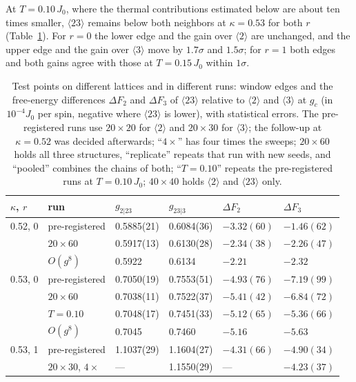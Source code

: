 \documentclass[aps,prb,twocolumn,superscriptaddress,floatfix]{revtex4-2}
\begin{document}
At $T=0.10\,J_0$, where the thermal contributions estimated below are about ten times smaller, $\langle23\rangle$
remains below both neighbors at $\kappa=0.53$ for both $r$ (Table~\ref{tab:lattices}). For $r=0$ the lower edge and the
gain over $\langle2\rangle$ are unchanged, and the upper edge and the gain over $\langle3\rangle$ move by $1.7\sigma$ and
$1.5\sigma$; for $r=1$ both edges and both gains agree with those at $T=0.15\,J_0$ within $1\sigma$.

\begin{table}
\caption{Test points on different lattices and in different runs: window edges and the free-energy
differences $\Delta F_2$ and $\Delta F_3$ of $\langle23\rangle$ relative to $\langle2\rangle$ and $\langle3\rangle$ at $g_c$
(in $10^{-4}J_0$ per spin, negative where $\langle23\rangle$ is lower), with statistical errors. The
pre-registered runs use $20\times20$ for $\langle2\rangle$ and $20\times30$ for $\langle3\rangle$; the follow-up at
$\kappa=0.52$ was decided afterwards; ``$4\times$'' has four times the sweeps; $20\times60$ holds all three
structures, ``replicate'' repeats that run with new seeds, and ``pooled'' combines the chains of both; ``$T=0.10$'' repeats the
pre-registered runs at $T=0.10\,J_0$; $40\times40$ holds $\langle2\rangle$ and $\langle23\rangle$ only.}
\label{tab:lattices}
\footnotesize\setlength{\tabcolsep}{1.2pt}
\begin{ruledtabular}
\begin{tabular}{llllll}
$\kappa$, $r$ & run & $g_{2|23}$ & $g_{23|3}$ & $\Delta F_2$ & $\Delta F_3$ \\
\hline
0.52, 0 & pre-registered & 0.5885(21) & 0.6084(36) & $-3.32(60)$ & $-1.46(62)$ \\
     & $20\times60$ & 0.5917(13) & 0.6130(28) & $-2.34(38)$ & $-2.26(47)$ \\
     & $O(g^8)$ & 0.5922 & 0.6134 & $-2.21$ & $-2.32$ \\
0.53, 0 & pre-registered & 0.7050(19) & 0.7553(51) & $-4.93(76)$ & $-7.19(99)$ \\
     & $20\times60$ & 0.7038(11) & 0.7522(37) & $-5.41(42)$ & $-6.84(72)$ \\
     & $T=0.10$ & 0.7048(17) & 0.7451(33) & $-5.12(65)$ & $-5.36(66)$ \\
     & $O(g^8)$ & 0.7045 & 0.7460 & $-5.16$ & $-5.63$ \\
0.53, 1 & pre-registered & 1.1037(29) & 1.1604(27) & $-4.31(66)$ & $-4.90(34)$ \\
     & $20\times30$, $4\times$ & --- & 1.1550(29) & --- & $-4.23(37)$ \\

\end{tabular}
\end{ruledtabular}
\end{table}
\end{document}
